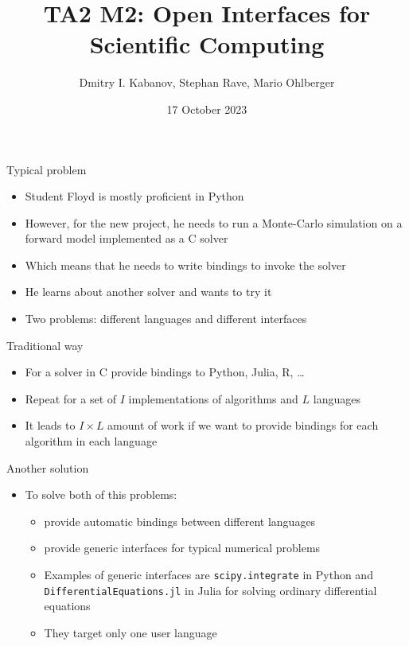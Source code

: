 \documentclass[10pt, aspectratio=169, progressbar=frametitle]{beamer}
\title{TA2 M2: Open Interfaces for Scientific Computing}
\author{Dmitry I. Kabanov, Stephan Rave, Mario Ohlberger}
\institute{University of Münster}
\date{17 October 2023}
\begin{document}
\maketitle

\begin{frame}{Typical problem}
  \begin{itemize}
    \item Student Floyd is mostly proficient in Python
    \item However, for the new project, he needs to run a Monte-Carlo
          simulation on a forward model implemented as a C solver
    \item Which means that he needs to write bindings to invoke the solver
    \item He learns about another solver and wants to try it
    \item \alert{Two problems:} different languages and different interfaces
  \end{itemize}
\end{frame}

\begin{frame}{Traditional way}
  \begin{minipage}{0.45\textwidth}
    \begin{itemize}
      \item For a solver in C provide bindings to Python, Julia, R, \dots
      \item Repeat for a set of $I$ implementations of algorithms and $L$ languages
      \item It leads to $I \times L$ amount of work if we want to provide
            bindings for each algorithm in each language
    \end{itemize}
  \end{minipage}\hfill
  \begin{minipage}{0.45\textwidth}
    
  \end{minipage}
\end{frame}

\begin{frame}{Another solution}
  \begin{itemize}
    \item To solve both of this problems:
          \begin{itemize}
            \item provide automatic bindings between different languages
            \item provide generic interfaces for typical numerical problems
            \item Examples of generic interfaces are \texttt{scipy.integrate} in Python
                  and \texttt{DifferentialEquations.jl} in Julia for solving ordinary
                  differential equations
            \item They target only one user language
          \end{itemize}
  \end{itemize}
\end{frame}
\end{document}
